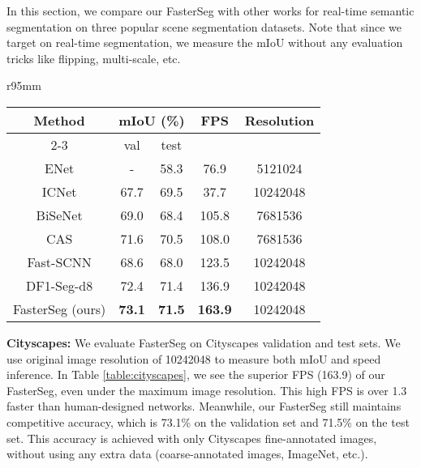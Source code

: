 \documentclass{article} \usepackage{iclr2020_conference,times}
\begin{document}
In this section, we compare our FasterSeg with other works for real-time semantic segmentation on three popular scene segmentation datasets. Note that since we target on real-time segmentation, we measure the mIoU without any evaluation tricks like flipping, multi-scale, etc.

\begin{wraptable}{r}{95mm}
\vspace{-1.5em}
\footnotesize
\begin{center}
\caption{mIoU and inference FPS on Ciytscapes validation and test sets.}
\begin{tabular}{ccccc}
\toprule
\multirow{2}{*}{Method} & \multicolumn{2}{c}{mIoU (\%)} & \multirow{2}{*}{FPS} & \multirow{2}{*}{Resolution} \\ \cmidrule{2-3}
 & val & test &  \\ \midrule
ENet \citep{paszke2016enet} & - & 58.3 & 76.9 & 5121024\\
ICNet \citep{zhao2018icnet} & 67.7 & 69.5 & 37.7 & 10242048 \\
BiSeNet \citep{yu2018bisenet} & 69.0 & 68.4 & 105.8 & 7681536 \\
CAS \citep{zhang2019customizable} & 71.6 & 70.5 & 108.0 & 7681536 \\
Fast-SCNN \citep{poudel2019fast} & 68.6 & 68.0 & 123.5 & 10242048\\
DF1-Seg-d8 \citep{li2019partial} & 72.4 & 71.4 & 136.9 & 10242048 \\
FasterSeg (ours) & \textbf{73.1} & \textbf{71.5} & \textbf{163.9} & 10242048 \\ \bottomrule
\end{tabular} \label{table:cityscapes}
\vspace{-1em}
\end{center}
\end{wraptable}

\textbf{Cityscapes:}
We evaluate FasterSeg on Cityscapes validation and test sets. We use original image resolution of 10242048 to measure both mIoU and speed inference. In Table \ref{table:cityscapes}, we see the superior FPS (163.9) of our FasterSeg, even under the maximum image resolution. This high FPS is over 1.3 faster than human-designed networks. Meanwhile, our FasterSeg still maintains competitive accuracy, which is 73.1\% on the validation set and 71.5\% on the test set. This accuracy is achieved with only Cityscapes fine-annotated images, without using any extra data (coarse-annotated images, ImageNet, etc.).
\end{document}
